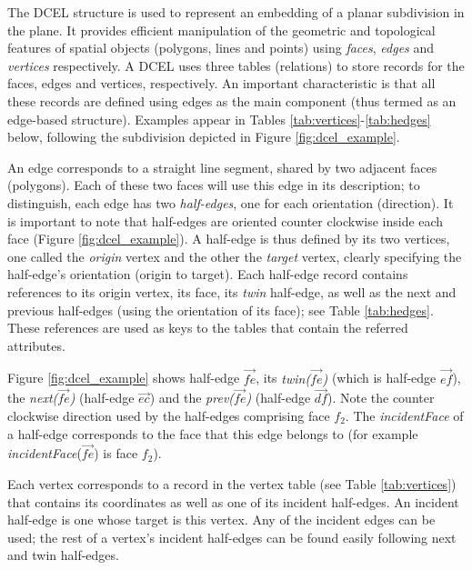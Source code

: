 \label{sec:prelim}

The DCEL \cite{muller_finding_1978} structure is used to represent an embedding of a planar subdivision in the plane. It provides efficient manipulation of the geometric and topological features of spatial objects (polygons, lines and points) using \textit{faces}, \textit{edges} and \textit{vertices} respectively.  
A DCEL uses three tables (relations) to store records for the faces, edges and vertices, respectively. 
An important characteristic is that all these records are defined using edges as the main component (thus termed as an edge-based structure). 
Examples appear in Tables \ref{tab:vertices}-\ref{tab:hedges} below, following the subdivision depicted in Figure \ref{fig:dcel_example}.

An edge corresponds to a straight line segment, shared by two adjacent faces (polygons).
Each of these two faces will use this edge in its description; to distinguish, each edge has two \textit{half-edges}, one for each orientation (direction).
It is important to note that half-edges are oriented counter clockwise inside each face (Figure \ref{fig:dcel_example}).
A half-edge is thus defined by its two vertices, one called the \textit{origin} vertex and the other the \textit{target} vertex, clearly specifying the half-edge's orientation (origin to target).
Each half-edge record contains references to its origin vertex, its face, its \textit{twin} half-edge, as well as the next and previous half-edges (using the orientation of its face); see Table \ref{tab:hedges}. These references are used as keys to the tables that contain the referred attributes. 

Figure \ref{fig:dcel_example} shows half-edge $\overrightarrow{fe}$, its \textit{twin($\overrightarrow{fe}$)} (which is half-edge $\overrightarrow{ef}$), the \textit{next($\overrightarrow{fe}$)} (half-edge $\overrightarrow{ec}$) and the \textit{prev($\overrightarrow{fe}$)} (half-edge $\overrightarrow{df}$). Note the counter clockwise direction used by the half-edges comprising face $f_2$. 
The \textit{incidentFace} of a half-edge corresponds to the face that this edge belongs to (for example \textit{incidentFace}($\overrightarrow{fe}$) is face $f_2$).

Each vertex corresponds to a record in the vertex table (see Table \ref{tab:vertices}) that contains its coordinates as well as one of its incident half-edges. An incident half-edge is one whose target is this vertex. Any of the incident edges can be used; the rest of a vertex's incident half-edges can be found easily following next and twin half-edges.

